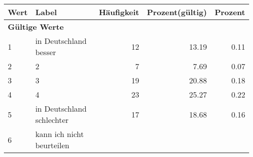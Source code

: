      \begin{longtable}{lXrrr}
     \toprule
     \textbf{Wert} & \textbf{Label} & \textbf{Häufigkeit} & \textbf{Prozent(gültig)} & \textbf{Prozent} \\
     \endhead
     \midrule
     \multicolumn{5}{l}{\textbf{Gültige Werte}}\\

     1 &
     \multicolumn{1}{X}{ in Deutschland besser   } &


       \num{12} &
       \num[round-mode=places,round-precision=2]{13,19} &
         \num[round-mode=places,round-precision=2]{0,11} \\

     2 &
     \multicolumn{1}{X}{ 2   } &


       \num{7} &
       \num[round-mode=places,round-precision=2]{7,69} &
         \num[round-mode=places,round-precision=2]{0,07} \\

     3 &
     \multicolumn{1}{X}{ 3   } &


       \num{19} &
       \num[round-mode=places,round-precision=2]{20,88} &
         \num[round-mode=places,round-precision=2]{0,18} \\

     4 &
     \multicolumn{1}{X}{ 4   } &


       \num{23} &
       \num[round-mode=places,round-precision=2]{25,27} &
         \num[round-mode=places,round-precision=2]{0,22} \\

     5 &
     \multicolumn{1}{X}{ in Deutschland schlechter   } &


       \num{17} &
       \num[round-mode=places,round-precision=2]{18,68} &
         \num[round-mode=places,round-precision=2]{0,16} \\

     6 &
     \multicolumn{1}{X}{ kann ich nicht beurteilen   } &



\end{longtable}

